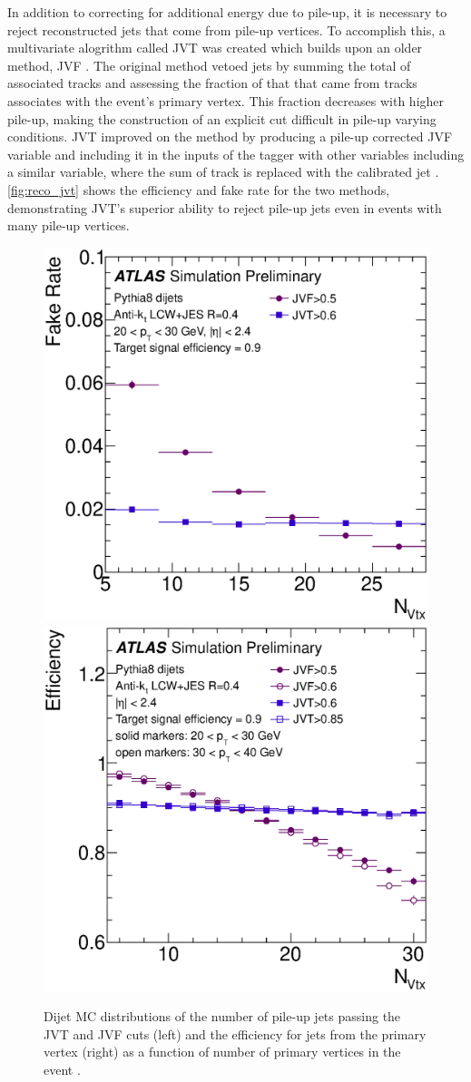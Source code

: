 In addition to correcting for additional energy due to pile-up, it is necessary to reject reconstructed jets that come from pile-up vertices. To accomplish this, a multivariate alogrithm called \ac{JVT} was created which builds upon an older method, \ac{JVF} \cite{ATLAS-CONF-2014-018}. The original method vetoed jets by summing the total \pt of associated tracks and assessing the fraction of that \pt that came from tracks associates with the event's primary vertex. This fraction decreases with higher pile-up, making the construction of an explicit cut difficult in pile-up varying conditions. \ac{JVT} improved on the method by producing a pile-up corrected \ac{JVF} variable and including it in the inputs of the tagger with other variables including a similar variable, where the sum of track \pt is replaced with the calibrated jet \pt. \autoref{fig:reco_jvt} shows the efficiency and fake rate for the two methods, demonstrating \ac{JVT}'s superior ability to reject pile-up jets even in events with many pile-up vertices.

\begin{centering}
\begin{figure}[!hbt]
\myfloatalign
\includegraphics[width=.48\linewidth]{figures/reco/jvt_fig_06b.eps}
\includegraphics[width=.48\linewidth]{figures/reco/jvt_fig_07a.eps}
\caption{ Dijet \ac{MC} distributions of the number of pile-up jets passing the \ac{JVT} and \ac{JVF} cuts (left) and the efficiency for jets from the primary vertex (right) as a function of number of primary vertices in the event \cite{ATLAS-CONF-2014-018}. }
\label{fig:reco_jvt}
\end{figure}
\end{centering}

